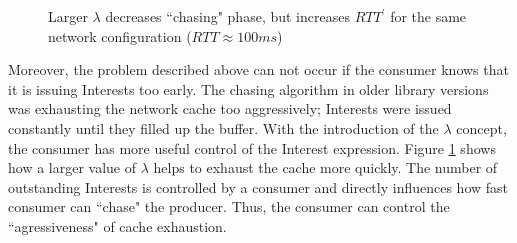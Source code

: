 \documentclass{icn/sig-alternate-2013} %
\begin{document}

\begin{figure}[t!]
\centering
\begin{scriptsize}
\end{scriptsize}
\caption{Larger $\lambda$ decreases ``chasing" phase, but increases $RTT^\prime$ for the same network configuration ($RTT\approx100ms$)}
\label{fig:ws}
\end{figure}

Moreover, the problem described above can not occur if the consumer knows that it is issuing Interests too early. The chasing algorithm in older library versions was exhausting the network cache too aggressively; Interests were issued constantly until they filled up the buffer.  With the introduction of the $\lambda$ concept, the consumer has more useful control of the Interest expression. Figure \ref{fig:ws} shows how a larger value of $\lambda$ helps to exhaust the cache more quickly. The number of outstanding Interests is controlled by a consumer and directly influences how fast consumer can ``chase" the producer. Thus, the consumer can control the ``agressiveness" of cache exhaustion.


\end{document}
